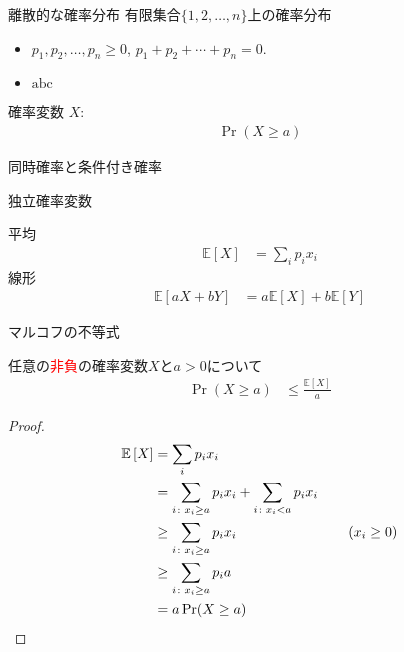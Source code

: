 \documentclass[lualatex,handout]{beamer}
\newcommand{\emm}[1]{\textcolor{red}{#1}}
\newcommand{\expt}[1]{\mathbb{E}\left[#1\right]}
\theoremstyle{definition}
\begin{document}
\begin{frame}{離散的な確率分布}
有限集合$\{1,2,\dotsc,n\}$上の確率分布
\begin{itemize}
\item $p_1, p_2, \dotsc, p_n\ge 0$, $p_1+p_2+\dotsb+p_n=0$.
\item $\mathrm{abc}$
\end{itemize}
\end{frame}

\begin{frame}{確率変数}
$X\colon $
\begin{align*}
\Pr(X\ge a)
\end{align*}
\end{frame}

\begin{frame}{同時確率と条件付き確率}

\end{frame}

\begin{frame}{独立確率変数}

\end{frame}

\begin{frame}{平均}
\begin{align*}
\expt{X} &= \sum_i p_i x_i
\end{align*}
線形
\begin{align*}
\expt{aX + bY} &= a\expt{X} + b\expt{Y} 
\end{align*}

\begin{example}
\end{example}
\end{frame}

\begin{frame}{マルコフの不等式}
\begin{theorem}[マルコフの不等式]
任意の\emm{非負}の確率変数$X$と$a>0$について
\begin{align*}
\Pr(X\ge a) &\le \frac{\expt{X}}{a}
\end{align*}
\end{theorem}
\begin{proof}
\vspace{-2em}
\begin{align*}
\expt{X} &= \sum_i p_i x_i\\
&= \sum_{i\colon x_i \ge a} p_i x_i
+ \sum_{i\colon x_i < a} p_i x_i\\
&\ge \sum_{i\colon x_i \ge a} p_i x_i\hspace{8em}(x_i\ge 0)\\
&\ge \sum_{i\colon x_i \ge a} p_i a\\
&= a\Pr(X\ge a) \qedhere
\end{align*}
\end{proof}
\end{frame}
\end{document}

